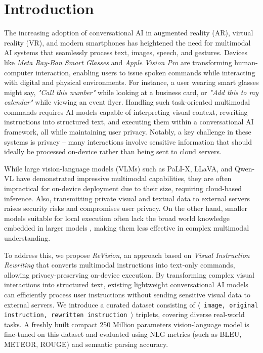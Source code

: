 \section{Introduction}
\label{sec:intro}
The increasing adoption of conversational AI in augmented reality (AR), virtual reality (VR), and modern smartphones has heightened the need for multimodal AI systems that seamlessly process text, images, speech, and gestures. Devices like \textit{Meta Ray-Ban Smart Glasses} and \textit{Apple Vision Pro} are transforming human-computer interaction, enabling users to issue spoken commands while interacting with digital and physical environments. For instance, a user wearing smart glasses might say, \textit{"Call this number"} while looking at a business card, or \textit{"Add this to my calendar"} while viewing an event flyer. Handling such task-oriented multimodal commands requires AI models capable of interpreting visual context, rewriting instructions into structured text, and executing them within a conversational AI framework, all while maintaining user privacy. Notably, a key challenge in these systems is privacy -- many interactions involve sensitive information that should ideally be processed on-device rather than being sent to cloud servers.

While large vision-language models (VLMs) such as PaLI-X, LLaVA, and Qwen-VL \cite{chen2023pali, liu2023llava, qwen-vl} have demonstrated impressive multimodal capabilities, they are often impractical for on-device deployment due to their size, requiring cloud-based inference. Also, transmitting private visual and textual data to external servers raises security risks and compromises user privacy. On the other hand, smaller models suitable for local execution often lack the broad world knowledge embedded in larger models \cite{small_models_limitations}, making them less effective in complex multimodal understanding.

To address this, we propose \textit{ReVision}, an approach based on \textit{Visual Instruction Rewriting} that converts multimodal instructions into text-only commands, allowing privacy-preserving on-device execution. By transforming complex visual interactions into structured text, existing lightweight conversational AI models can efficiently process user instructions without sending sensitive visual data to external servers. We introduce a curated dataset consisting of \texttt{$\langle$ image, original instruction, rewritten instruction $\rangle$} triplets, covering diverse real-world tasks. A freshly built compact 250 Million parameters vision-language model \cite{liu2023llava} is fine-tuned on this dataset and evaluated using NLG metrics (such as BLEU, METEOR, ROUGE) and semantic parsing accuracy.


